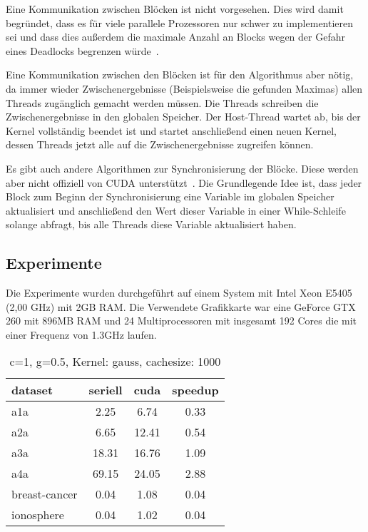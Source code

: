 \documentclass{scrartcl}
\begin{document}
Eine Kommunikation zwischen Blöcken ist nicht vorgesehen.
Dies wird damit begründet, dass es für viele parallele Prozessoren nur schwer zu implementieren sei und dass dies außerdem die maximale Anzahl an Blocks wegen der Gefahr eines Deadlocks begrenzen würde~\cite{parallelreduction}.

Eine Kommunikation zwischen den Blöcken ist für den Algorithmus aber nötig, da immer wieder Zwischenergebnisse (Beispielsweise die gefunden Maximas) allen Threads zugänglich gemacht werden müssen.
Die Threads schreiben die Zwischenergebnisse in den globalen Speicher. Der Host-Thread wartet ab, bis der Kernel vollständig beendet ist und startet anschließend einen neuen Kernel, dessen Threads jetzt alle auf die Zwischenergebnisse zugreifen können.

Es gibt auch andere Algorithmen zur Synchronisierung der Blöcke. Diese werden aber nicht offiziell von CUDA unterstützt~\cite{interblockgpusync}.
Die Grundlegende Idee ist, dass jeder Block zum Beginn der Synchronisierung eine Variable im globalen Speicher aktualisiert und anschließend den Wert dieser Variable in einer While-Schleife solange abfragt, bis alle Threads diese Variable aktualisiert haben.
\subsection{Experimente}
Die Experimente wurden durchgeführt auf einem System mit Intel Xeon E5405 (2,00 GHz) mit 2GB RAM. 
Die Verwendete Grafikkarte war eine GeForce GTX 260 mit 896MB RAM und 24 Multiprocessoren mit insgesamt 192 Cores die mit einer Frequenz von 1.3GHz laufen.


\pagebreak

\begin{table}
\begin{center}
\begin{tabular}{|l|c|c|c|}
\hline
dataset & seriell & cuda & speedup \\
\hline
a1a & 2.25 & 6.74 & 0.33 \\
a2a & 6.65 & 12.41 & 0.54 \\
a3a & 18.31 & 16.76 & 1.09 \\
a4a & 69.15 & 24.05 & 2.88 \\
breast-cancer & 0.04 & 1.08 & 0.04 \\
ionosphere & 0.04 & 1.02 & 0.04 \\
\hline
\end{tabular}
\end{center}
\caption{ c=1, g=0.5, Kernel: gauss, cachesize: 1000}
\end{table}
\end{document}
